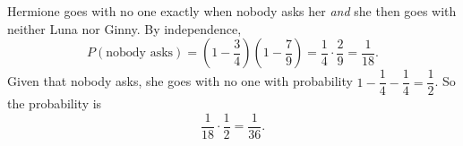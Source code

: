 Hermione goes with no one exactly when nobody asks her \emph{and} she then goes with neither Luna nor Ginny. By independence,
\[P(\text{nobody asks})=\left(1-\dfrac{3}{4}\right)\left(1-\dfrac{7}{9}\right)=\dfrac{1}{4}\cdot\dfrac{2}{9}=\dfrac{1}{18}.\]
Given that nobody asks, she goes with no one with probability $1-\dfrac{1}{4}-\dfrac{1}{4}=\dfrac{1}{2}$. So the probability is
\[\dfrac{1}{18}\cdot\dfrac{1}{2}=\boxed{\dfrac{1}{36}}.\]
